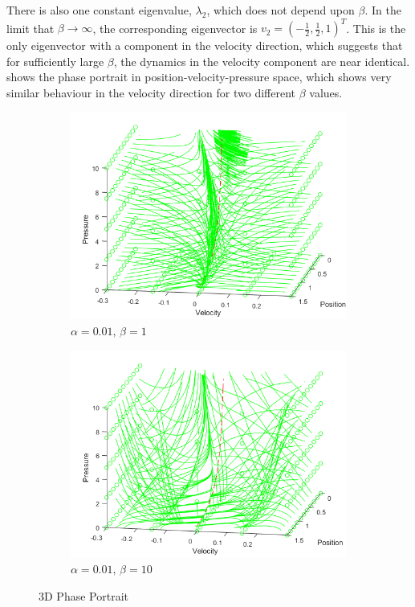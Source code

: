 There is also one constant eigenvalue, $\lambda_2$, which does not depend upon $\beta$. In the limit that $\beta \rightarrow \infty$, the corresponding eigenvector is $v_2 = \left( - \frac{1}{2}, \frac{1}{2}, 1 \right)^T$. This is the only eigenvector with a component in  the velocity direction, which suggests that for sufficiently large $\beta$, the dynamics in the velocity component are near identical.  shows the phase portrait in position-velocity-pressure space, which shows very similar behaviour in the velocity direction for two different $\beta$ values.
~
% 
\begin{figure}[ht]
    \centering
    \begin{subfigure}{0.49\textwidth}
    \includegraphics[width=\textwidth]{Figures/LowFlow/3DPhase-b=1.png}
    \caption{$\alpha = 0.01, \, \beta = 1$}
    \end{subfigure}
    \begin{subfigure}{0.49\textwidth}
    \includegraphics[width=\textwidth]{Figures/LowFlow/3DPhase-b=10.png}
    \caption{$\alpha = 0.01, \, \beta = 10$}
    \end{subfigure}
    \caption{3D Phase Portrait}
    \label{fig: ValveClose3DPhase}
\end{figure}

